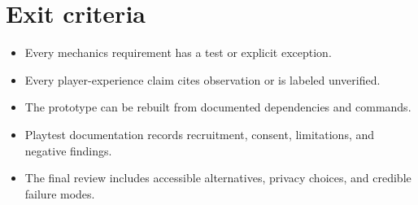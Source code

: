 \documentclass[11pt]{article}
\begin{document}
\section{Exit criteria}
\begin{itemize}
\item Every mechanics requirement has a test or explicit exception.
\item Every player-experience claim cites observation or is labeled unverified.
\item The prototype can be rebuilt from documented dependencies and commands.
\item Playtest documentation records recruitment, consent, limitations, and negative findings.
\item The final review includes accessible alternatives, privacy choices, and credible failure modes.
\end{itemize}
\end{document}
